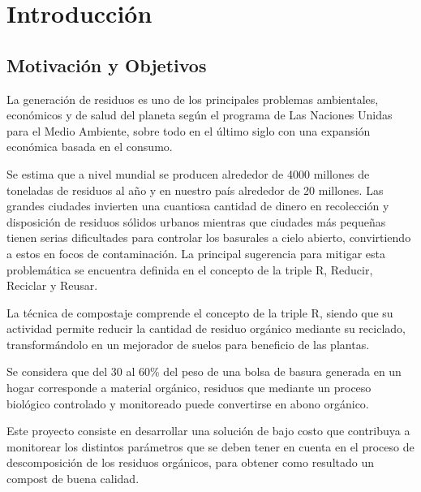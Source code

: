 \chapter{Introducción} %

\label{Chapter1} %
\label{IntroGeneral}




\section{Motivación y Objetivos}
\label{sec:MotivacionyObjetivos}

La generación de residuos es uno de los principales problemas ambientales, económicos y de salud del planeta según el programa de Las Naciones Unidas para el Medio Ambiente\citep{GWMO2024}, sobre todo en el último siglo con una expansión económica basada en el consumo.

Se estima que a nivel mundial se producen alrededor de 4000 millones de toneladas de residuos al año y en nuestro país alrededor de 20 millones. Las grandes ciudades invierten una cuantiosa cantidad de dinero en recolección y disposición de residuos sólidos urbanos mientras que ciudades más pequeñas tienen serias dificultades para controlar los basurales a cielo abierto, convirtiendo a estos en focos de contaminación.
La principal sugerencia para mitigar esta problemática se encuentra definida en el concepto de la triple R, Reducir, Reciclar y Reusar.

La técnica de compostaje comprende el concepto de la triple R, siendo que su actividad permite reducir la cantidad de residuo orgánico mediante su reciclado, transformándolo en un mejorador de suelos para beneficio de las plantas.

Se considera que del 30 al 60\% del peso de una bolsa de basura generada en un hogar corresponde a material orgánico, residuos que mediante un proceso biológico controlado y monitoreado puede convertirse en abono orgánico.

Este proyecto consiste en desarrollar una solución de bajo costo que contribuya a monitorear los distintos parámetros que se deben tener en cuenta en el proceso de descomposición de los residuos orgánicos, para obtener como resultado un compost de buena calidad.

